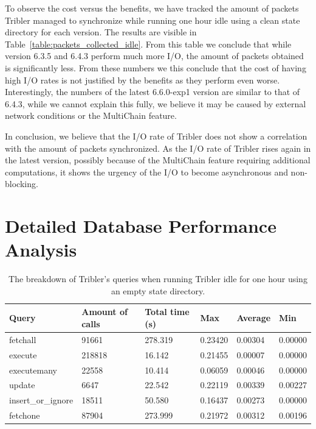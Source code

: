 To observe the cost versus the benefits, we have tracked the amount of packets Tribler managed to synchronize while running one hour idle using a clean state directory for each version.
The results are visible in Table~\ref{table:packets_collected_idle}.
From this table we conclude that while version 6.3.5 and 6.4.3 perform much more I/O, the amount of packets obtained is significantly less.
From these numbers we this conclude that the cost of having high I/O rates is not justified by the benefits as they perform even worse. 
Interestingly, the numbers of the latest 6.6.0-exp1 version are similar to that of 6.4.3, while we cannot explain this fully, we believe it may be caused by external network conditions or the MultiChain feature.

In conclusion, we believe that the I/O rate of Tribler does not show a correlation with the amount of packets synchronized. As the I/O rate of Tribler rises again in the latest version, possibly because of the MultiChain feature requiring additional computations, it shows the urgency of the I/O to become asynchronous and non-blocking.

\section{Detailed Database Performance Analysis}
\label{sct:db_performance_analysis}

\begin{table}[h]
	\centering
	\caption{The breakdown of Tribler's queries when running Tribler idle for one hour using an empty state directory.}
	\label{table:query_breakdown_tribler_empty_state_dir}
	\begin{tabular}{|l|l|l|l|l|l|}
		\hline
		\textbf{Query}     & \textbf{Amount of calls} & \textbf{Total time (s)} & \textbf{Max} & \textbf{Average} & \textbf{Min} \\ \hline
		fetchall           & 91661                    & 278.319                 & 0.23420      & 0.00304          & 0.00000      \\ \hline
		execute            & 218818                   & 16.142                  & 0.21455      & 0.00007          & 0.00000      \\ \hline
		executemany        & 22558                    & 10.414                  & 0.06059      & 0.00046          & 0.00000      \\ \hline
		update             & 6647                     & 22.542                  & 0.22119      & 0.00339          & 0.00227      \\ \hline
		insert\_or\_ignore & 18511                    & 50.580                  & 0.16437      & 0.00273          & 0.00000      \\ \hline
		fetchone           & 87904                    & 273.999                 & 0.21972      & 0.00312          & 0.00196      \\ \hline
	\end{tabular}
\end{table}

